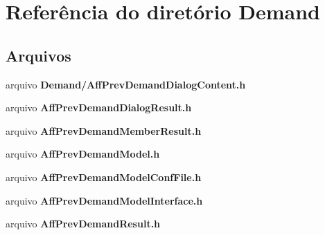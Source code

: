 \section{Referência do diretório Demand}
\label{dir_678a4ff3618d9c13e7606d0c9228d3a5}
\subsection*{Arquivos}
\begin{DoxyCompactItemize}
\item 
arquivo {\bf Demand/\+Aff\+Prev\+Demand\+Dialog\+Content.\+h}
\item 
arquivo {\bf Aff\+Prev\+Demand\+Dialog\+Result.\+h}
\item 
arquivo {\bf Aff\+Prev\+Demand\+Member\+Result.\+h}
\item 
arquivo {\bf Aff\+Prev\+Demand\+Model.\+h}
\item 
arquivo {\bf Aff\+Prev\+Demand\+Model\+Conf\+File.\+h}
\item 
arquivo {\bf Aff\+Prev\+Demand\+Model\+Interface.\+h}
\item 
arquivo {\bf Aff\+Prev\+Demand\+Result.\+h}
\end{DoxyCompactItemize}
